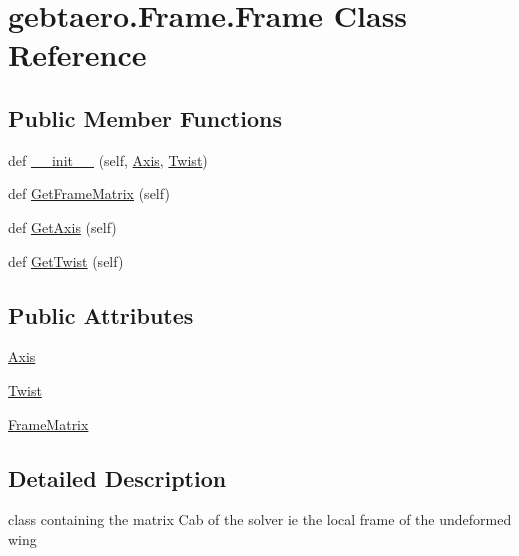 \hypertarget{classgebtaero_1_1_frame_1_1_frame}{}\section{gebtaero.\+Frame.\+Frame Class Reference}
\label{classgebtaero_1_1_frame_1_1_frame}
\subsection*{Public Member Functions}
\begin{DoxyCompactItemize}
\item 
def \hyperlink{classgebtaero_1_1_frame_1_1_frame_a39d919d9d67030dafbe8a4cf44ea53d5}{\+\_\+\+\_\+init\+\_\+\+\_\+} (self, \hyperlink{classgebtaero_1_1_frame_1_1_frame_ae08a3f5d573566b87a5a3f206d312a47}{Axis}, \hyperlink{classgebtaero_1_1_frame_1_1_frame_ab64cc356fbc0c271e985c7d6694e31bc}{Twist})
\item 
def \hyperlink{classgebtaero_1_1_frame_1_1_frame_a4c00a12dd5023ac5220c863d9b806da0}{Get\+Frame\+Matrix} (self)
\item 
def \hyperlink{classgebtaero_1_1_frame_1_1_frame_a72f88d5e0ae61e459545178d564caaf6}{Get\+Axis} (self)
\item 
def \hyperlink{classgebtaero_1_1_frame_1_1_frame_aaf3d8c0081afde32def48d733d95d3a9}{Get\+Twist} (self)
\end{DoxyCompactItemize}
\subsection*{Public Attributes}
\begin{DoxyCompactItemize}
\item 
\hyperlink{classgebtaero_1_1_frame_1_1_frame_ae08a3f5d573566b87a5a3f206d312a47}{Axis}
\item 
\hyperlink{classgebtaero_1_1_frame_1_1_frame_ab64cc356fbc0c271e985c7d6694e31bc}{Twist}
\item 
\hyperlink{classgebtaero_1_1_frame_1_1_frame_ac066f787b43713ffdce16e36acfbfdee}{Frame\+Matrix}
\end{DoxyCompactItemize}


\subsection{Detailed Description}
\begin{DoxyVerb}class containing the matrix Cab of the solver ie the local frame of the undeformed wing
\end{DoxyVerb}
 

